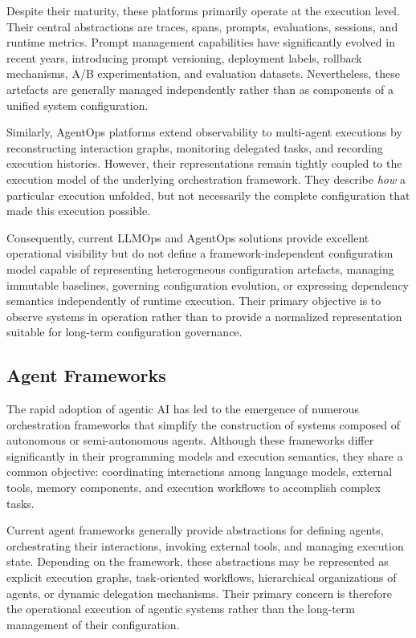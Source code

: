 \documentclass[10pt]{article}
\begin{document}
Despite their maturity, these platforms primarily operate at the execution level. Their central abstractions are traces, spans, prompts, evaluations, sessions, and runtime metrics. Prompt management capabilities have significantly evolved in recent years, introducing prompt versioning, deployment labels, rollback mechanisms, A/B experimentation, and evaluation datasets. Nevertheless, these artefacts are generally managed independently rather than as components of a unified system configuration.

Similarly, AgentOps platforms extend observability to multi-agent executions by reconstructing interaction graphs, monitoring delegated tasks, and recording execution histories. However, their representations remain tightly coupled to the execution model of the underlying orchestration framework. They describe \emph{how} a particular execution unfolded, but not necessarily the complete configuration that made this execution possible.

Consequently, current LLMOps and AgentOps solutions provide excellent operational visibility but do not define a framework-independent configuration model capable of representing heterogeneous configuration artefacts, managing immutable baselines, governing configuration evolution, or expressing dependency semantics independently of runtime execution. Their primary objective is to observe systems in operation rather than to provide a normalized representation suitable for long-term configuration governance.

\subsection{Agent Frameworks}
\label{sec:agent_frameworks}

The rapid adoption of agentic AI has led to the emergence of numerous orchestration frameworks that simplify the construction of systems composed of autonomous or semi-autonomous agents. Although these frameworks differ significantly in their programming models and execution semantics, they share a common objective: coordinating interactions among language models, external tools, memory components, and execution workflows to accomplish complex tasks.

Current agent frameworks generally provide abstractions for defining agents, orchestrating their interactions, invoking external tools, and managing execution state. Depending on the framework, these abstractions may be represented as explicit execution graphs, task-oriented workflows, hierarchical organizations of agents, or dynamic delegation mechanisms. Their primary concern is therefore the operational execution of agentic systems rather than the long-term management of their configuration.
\end{document}
